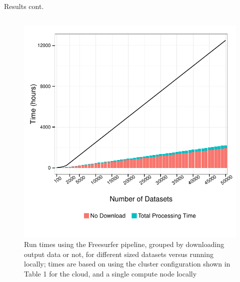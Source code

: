 \documentclass[final,hyperref={pdfpagelabels=false}]{beamer}
\begin{document}
\begin{frame}
\begin{columns}
\begin{column}{.5\textwidth}
{\begin{block}{Results cont.}
\begin{column}{.47\textwidth}
\begin{figure}
                  \includegraphics[width=.99\textwidth]{fs-times.pdf}
                  \caption{\label{fig:fs-times}Run times using the Freesurfer pipeline, grouped by downloading output data or not, for different sized datasets versus running locally; times are based on using the cluster configuration shown in Table 1 for the cloud, and a single compute node locally}
              \end{figure}

\end{column}
\end{block}}
\end{column}
\end{columns}
\end{frame}
\end{document}
